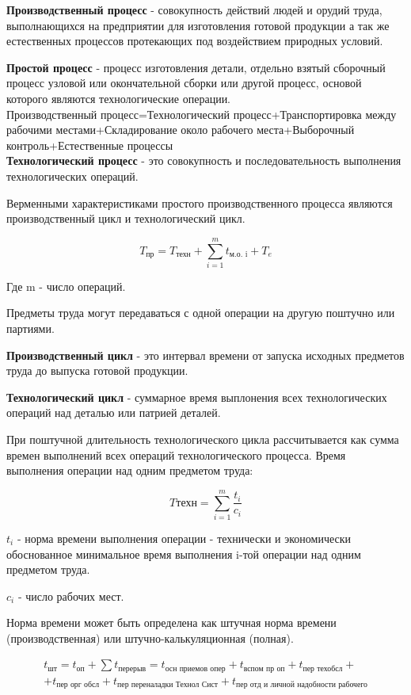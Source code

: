 \documentclass[14pt,a4paper,oneside]{extarticle}
\begin{document}
\textbf{Производственный процесс} - совокупность действий людей и орудий труда, выполнающихся на предприятии для изготовления готовой продукции а так же естественных процессов протекающих под воздействием природных условий.

\textbf{Простой процесс} - процесс изготовления детали, отдельно взятый сборочный процесс узловой или окончательной сборки или другой процесс, основой которого являются технологические операции.
\\
Производственный процесс=Технологический процесс+Транспортировка между рабочими местами+Складирование около рабочего места+Выборочный контроль+Естественные процессы
\\

\textbf{Технологический процесс} - это совокупность и последовательность выполнения технологических операций.

Верменными характеристиками простого производственного процесса являются производственный цикл и технологический цикл.

\[T_\text{пр}=T_\text{техн}+\sum_{i=1}^m t_\text{м.о. i}+T_e\]

Где m - число операций.

Предметы труда могут передаваться с одной операции на другую поштучно или партиями.

\textbf{Производственный цикл} - это интервал времени от запуска исходных предметов труда до выпуска готовой продукции.

\textbf{Технологический цикл} - суммарное время выплонения всех технологических операций над деталью или патрией деталей.

При поштучной длительность технологического цикла рассчитывается как сумма времен выполнений всех операций технологического процесса. Время выполнения операции над одним предметом труда:

\[T\text{техн}=\sum_{i=1}^{m}\frac{t_i}{c_i}\]

$t_i$ - норма времени выполнения операции - технически и экономически обоснованное минимальное время выполнения i-той операции над одним предметом труда.

$c_i$ - число рабочих мест.

Норма времени может быть определена как штучная норма времени (производственная) или штучно-калькуляционная (полная).

\begin{gather*}
        t_\text{шт}=t_\text{оп}+\sum t_\text{перерыв}=t_\text{осн приемов опер}+t_\text{вспом пр оп}+ t_\text{пер техобсл}+\\+t_\text{пер орг обсл}+t_\text{пер переналадки Технол Сист}+t_\text{пер отд и личной надобности рабочего}
\end{gather*}
\end{document}
